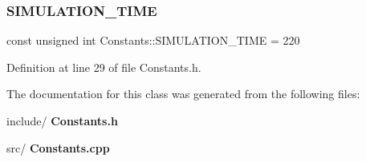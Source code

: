 \subsubsection{SIMULATION\_TIME}
{\footnotesize\ttfamily const unsigned int Constants\+::\+S\+I\+M\+U\+L\+A\+T\+I\+O\+N\+\_\+\+T\+I\+ME = 220\hspace{0.3cm}{\ttfamily [static]}}



Definition at line 29 of file Constants.\+h.



The documentation for this class was generated from the following files\+:\begin{DoxyCompactItemize}
\item 
include/\textbf{ Constants.\+h}\item 
src/\textbf{ Constants.\+cpp}\end{DoxyCompactItemize}
